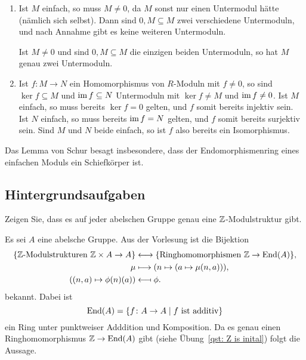 \begin{solution}
  \begin{enumerate}
    \item
      Ist $M$ einfach, so muss $M \neq 0$, da $M$ sonst nur einen Untermodul hätte (nämlich sich selbst).
      Dann sind $0, M \subseteq M$ zwei verschiedene Untermoduln, und nach Annahme gibt es keine weiteren Untermoduln.
      
      Ist $M \neq 0$ und sind $0, M \subseteq M$ die einzigen beiden Untermoduln, so hat $M$ genau zwei Untermoduln.
    \item
      Ist $f \colon M \to N$ ein Homomorphismus von $R$-Moduln mit $f \neq 0$, so sind $\ker f \subseteq M$ und $\operatorname{im} f \subseteq N$ Untermoduln mit $\ker f \neq M$ und $\operatorname{im} f \neq 0$.
      Ist $M$ einfach, so muss bereits $\ker f = 0$ gelten, und $f$ somit bereits injektiv sein.
      Ist $N$ einfach, so muss bereits $\operatorname{im} f = N$ gelten, und $f$ somit bereits surjektiv sein.
      Sind $M$ und $N$ beide einfach, so ist $f$ also bereits ein Isomorphismus.
  \end{enumerate}
\end{solution}


\begin{remark*}
  Das Lemma von Schur besagt insbesondere, dass der Endomorphismenring eines einfachen Moduls ein Schiefkörper ist.
\end{remark*}





\subsection{Hintergrundsaufgaben}


\begin{question}[subtitle = $\Integer$-Moduln und abelsche Gruppen]
  \label{question: abelian groups are the same as modules over Z}
  Zeigen Sie, dass es auf jeder abelschen Gruppe genau eine $\Integer$-Modulstruktur gibt.
\end{question}


\begin{solution}
  Es sei $A$ eine abelsche Gruppe.
  Aus der Vorlesung ist die Bijektion
  \begin{align*}
    \{\text{$\mathbb{Z}$-Modulstrukturen $\mathbb{Z} \times A \to A$}\}
    &\longleftrightarrow
    \{\text{Ringhomomorphismen $\mathbb{Z} \to \operatorname{End}(A)$}\},
    \\
                    \mu
    &\longmapsto    (n \mapsto (a \mapsto \mu(n,a))),
    \\
                    ( (n,a) \mapsto \phi(n)(a) )
    &\longmapsfrom  \phi.
  \end{align*}
  bekannt.
  Dabei ist
  \[
      \operatorname{End}(A)
    = \{f \colon A \to A \mid \text{$f$ ist additiv}\}
  \]
  ein Ring unter punktweiser Adddition und Komposition.
  Da es genau einen Ringhomomorphismus $\mathbb{Z} \to \operatorname{End}(A)$ gibt (siehe Übung~\ref{qst: Z is inital}) folgt die Aussage.
\end{solution}


